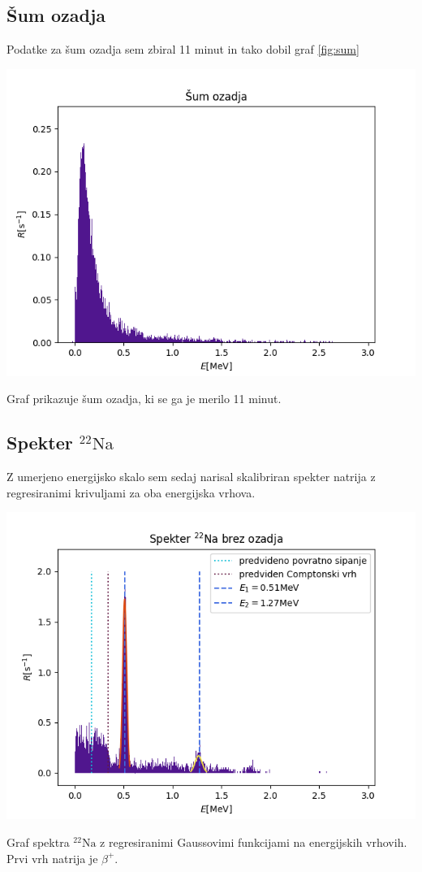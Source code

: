 \documentclass[11pt]{article}
\begin{document}
\subsection{Šum ozadja}\label{sec:org39e42a5}

Podatke za šum ozadja sem zbiral 11 minut in tako dobil graf \ref{fig:sum}

\begin{slika}[H]
\begin{center}
\includegraphics[width=.9\linewidth]{figures/ozadje.png}
\caption{\small Graf prikazuje šum ozadja, ki se ga je merilo 11 minut. }\label{fig:sum}
\end{center}
\end{slika}

\subsection{Spekter \(^{22} \mathrm{Na}\)}\label{sec:org0586687}

Z umerjeno energijsko skalo sem sedaj narisal skalibriran spekter natrija z regresiranimi krivuljami za oba energijska vrhova.

\begin{slika}[H]
\begin{center}
\includegraphics[width=.9\linewidth]{figures/na22_no_bg.png}
\caption{\small Graf spektra $^{22} \mathrm{Na}$ z regresiranimi Gaussovimi funkcijami na energijskih vrhovih. Prvi vrh natrija je \(  \beta ^{+} \).}
\end{center}
\end{slika}
\end{document}
